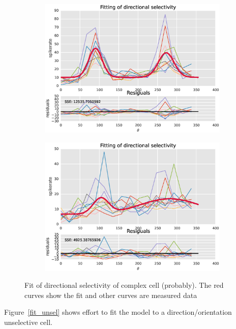 \documentclass[11pt]{article}
\begin{document}
\begin{figure}
\begin{subfigure}{.48\textwidth}
        \includegraphics[width=\linewidth]{plots/fit_complex3}
    \end{subfigure}
    \begin{subfigure}{.48\textwidth}
        \centering
        \includegraphics[width=\linewidth]{plots/fit_complex4}
    \end{subfigure}
    \caption{Fit of directional selectivity of complex cell (probably). The red curves show the fit and other curves are measured data}
    \label{fit_complex}
\end{figure}
Figure~\ref{fit_unsel} shows effort to fit the model to a direction/orientation unselective cell.
\end{document}
